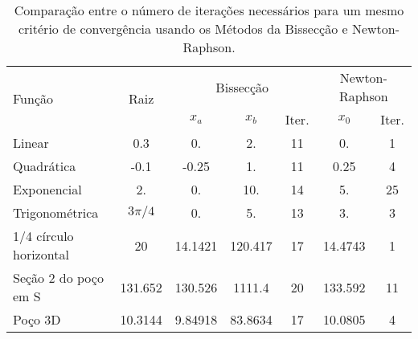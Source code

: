 \documentclass[final,5p]{elsarticle}
\numberwithin{equation}{section}
\begin{document}
    \begin{table*} 
        \caption{Comparação entre o número de iterações necessários para um mesmo critério de convergência usando os Métodos da Bissecção e Newton-Raphson.}
        \begin{tabular}{ l c c c c c c }
            \hline
            \multirow{2}{*}{Função} & \multirow{2}{*}{Raiz} & \multicolumn{3}{c}{Bissecção} & \multicolumn{2}{c}{Newton-Raphson} \\
            &  & $x_a$ & $x_b$ & Iter. & $x_0$ & Iter. \\ 
            \hline
            Linear & 0.3 & 0. & 2. &  11 & 0. & 1\\
            Quadrática & -0.1 & -0.25 & 1. & 11 & 0.25 & 4  \\
            Exponencial  & 2. & 0. & 10. & 14 & 5. & 25 \\
            Trigonométrica & $3\pi/4$ & 0. & 5. & 13 & 3. & 3  \\
            1/4 círculo horizontal & 20 & 14.1421 & 120.417 & 17 & 14.4743 & 1 \\
            Seção 2 do poço em S & 131.652 & 130.526 & 1111.4 & 20 & 133.592 & 11 \\
            Poço 3D & 10.3144 & 9.84918 & 83.8634 & 17 & 10.0805 & 4 \\
            \hline
        \end{tabular}
        \label{table:iteracoes}
    \end{table*}
    
\end{document}
